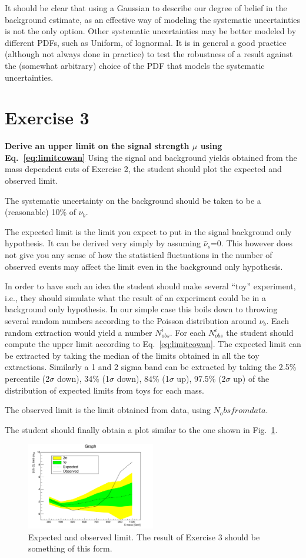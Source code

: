 \documentclass[a4paper,12pt]{article}
\begin{document}
It should be clear that using a Gaussian to describe our degree of belief in
the background estimate, as an effective way of modeling the systematic
uncertainties is not the only option. Other systematic uncertainties may be
better modeled by different PDFs, such as Uniform, of lognormal. It is in
general a good practice (although not always done in practice) to test the
robustness of a result against the (somewhat arbitrary) choice of the PDF that
models the systematic uncertainties.

\section*{Exercise 3}
{\bf Derive an upper limit on the signal strength $\mu$ using
Eq.~\ref{eq:limitcowan}}
Using the signal and background yields obtained from the mass dependent cuts
of Exercise 2, the student should plot the expected and observed limit.

The systematic uncertainty on the background should be taken to be a
(reasonable) 10\% of $\nu_b$.

The expected limit is the limit you expect to put in the signal background
only hypothesis. It can be derived very simply by assuming $\hat{\nu}_s$=0.
This however does not give you any sense of how the statistical fluctuations
in the number of observed events may affect the limit even in the background
only hypothesis. 

In order to have such an idea the student should make several
``toy'' experiment, i.e., they should simulate what the result of an
experiment  could be in a background only hypothesis. In our simple case this
boils down to throwing several random numbers according to the Poisson
distribution around $\nu_b$. Each random extraction would yield a number
$N_{obs}^i$. For each $N_{obs}^i$ the student should compute the upper limit
according to Eq.~\ref{eq:limitcowan}. The expected limit can be extracted by
taking the median of the limits obtained in all the toy extractions. Similarly
a 1 and 2 sigma band can be extracted by taking the 2.5\% percentile
(2$\sigma$ down), 34\% (1$\sigma$ down), 84\% (1$\sigma$ up), 97.5\%
(2$\sigma$ up) of the distribution of expected limits from toys for each mass. 

The observed limit is the limit obtained from data, using $N_obs from data$.

The student should finally obtain a plot similar to the one shown in
Fig.~\ref{fig:limitCowan}.
\begin{figure}[!b]
\centering
\includegraphics[width=0.5\textwidth]{images/limitCowan.pdf}
\caption{Expected and observed limit. The result of Exercise 3 should be
something of this form.\label{fig:limitCowan}}

\end{figure}
\end{document}
